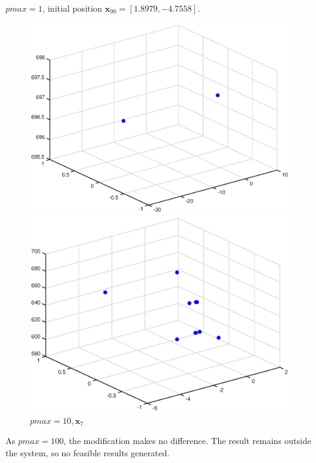 \documentclass{article}
\begin{document}
$pmax=1$, initial position $\mathbf{x}_{90} = [1.8979,-4.7558]$.
\begin{figure}[h]
\begin{minipage}[t]{0.5\linewidth}
\centering
\includegraphics[scale=0.4]{23}
\caption{$pmax=100,\mathbf{x}_6$}
\end{minipage}%
\begin{minipage}[t]{0.5\linewidth}
\centering
\includegraphics[scale=0.4]{24}
\caption{$pmax=10,\mathbf{x}_7$}
\end{minipage}
\end{figure}

\noindent
As $pmax = 100$, the modification makes no difference. The result remains outside the system, so no feasible results generated.
\end{document}
